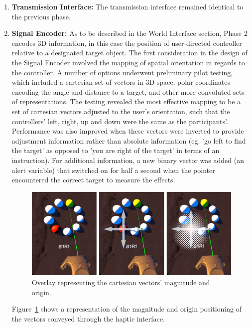 \documentclass[
hidelinks,
12pt, %
oneside, %
english, %
doublespacing, %
headsepline, %
]{MastersDoctoralThesis} %
\begin{document}
\begin{enumerate}

	\item \textbf{Transmission Interface:} The transmission interface remained identical to the previous phase.

	\item \textbf{Signal Encoder:} As to be described in the World Interface section, Phase 2 encodes 3D information, in this case the position of user-directed controller relative to a designated target object. The first consideration in the design of the Signal Encoder involved the mapping of spatial orientation in regards to the controller. A number of options underwent preliminary pilot testing, which included a cartesian set of vectors in 3D space, polar coordinates encoding the angle and distance to a target, and other more convoluted sets of representations. The testing revealed the most effective mapping to be a set of cartesian vectors adjusted to the user's orientation, such that the controllers' left, right, up and down were the same as the participants'. Performance was also improved when these vectors were inverted to provide adjustment information rather than absolute information (eg. 'go left to find the target' as opposed to 'you are right of the target' in terms of an instruction). For additional information, a new binary vector was added (an alert variable) that switched on for half a second when the pointer encountered the correct target to measure the effects.

	\begin{figure}[h]
		\centering\includegraphics[width=1\linewidth]{images/fittscoords.png}
		\decoRule
		\caption[Cartesian Vectors in VR]{Overlay representing the cartesian vectors' magnitude and origin.}
		\label{fig:fittscoords}
	\end{figure}

	Figure~\ref{fig:fittscoords} shows a representation of the magnitude and origin positioning of the vectors conveyed through the haptic interface.



\end{enumerate}
\end{document}
